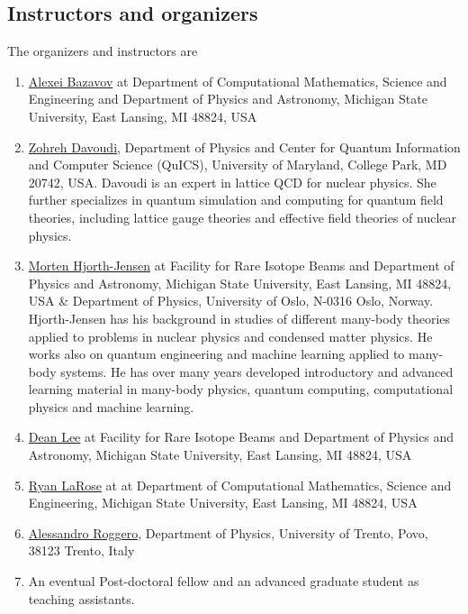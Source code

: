 \documentclass[superscriptaddress,amsmath,amssymb,aps,floatfix]{revtex4-2}
\begin{document}
\subsection{Instructors and organizers}\label{instructors-and-organizers}

The organizers and instructors are


\begin{enumerate}
\item 
\href{https://directory.natsci.msu.edu/Directory/Profiles/Person/101033}{Alexei
Bazavov} at Department of Computational Mathematics, Science and
Engineering and Department of Physics and Astronomy, Michigan State
University, East Lansing, MI 48824, USA
\item
  \href{https://umdphysics.umd.edu/people/faculty/current/item/927-davoudi.html}{Zohreh
  Davoudi}, Department of Physics and Center for Quantum Information and Computer Science (QuICS), University of Maryland, College Park,
  MD 20742, USA. Davoudi is an expert in lattice QCD for nuclear physics. She further
  specializes in quantum simulation and computing for quantum field
  theories, including lattice gauge theories and effective field
  theories of nuclear physics.

\item
  \href{http://mhjgit.github.io/info/doc/web/}{Morten Hjorth-Jensen} at
  Facility for Rare Isotope Beams and Department of Physics and
  Astronomy, Michigan State University, East Lansing, MI 48824, USA \&
  Department of Physics, University of Oslo, N-0316 Oslo, Norway. Hjorth-Jensen has his background in studies of different many-body theories applied to problems in nuclear physics and condensed matter physics. He works also on quantum engineering and machine learning applied to many-body systems. He has over many years developed introductory and advanced learning material in many-body physics, quantum computing, computational physics and machine learning.
\item
  \href{https://frib.msu.edu/for-students/faculty/lee-profile}{Dean Lee}
  at Facility for Rare Isotope Beams and Department of Physics and
  Astronomy, Michigan State University, East Lansing, MI 48824, USA
\item
  \href{https://www.ryanlarose.com/}{Ryan LaRose} at at Department of
  Computational Mathematics, Science and Engineering, Michigan State
  University, East Lansing, MI 48824, USA
\item
  \href{https://webapps.unitn.it/du/en/Persona/PER0016084/Didattica}{Alessandro
  Roggero}, Department of Physics, University of Trento, Povo, 38123
  Trento, Italy
\item
  An eventual Post-doctoral fellow and an advanced graduate student as
  teaching assistants.
\end{enumerate}
\end{document}
